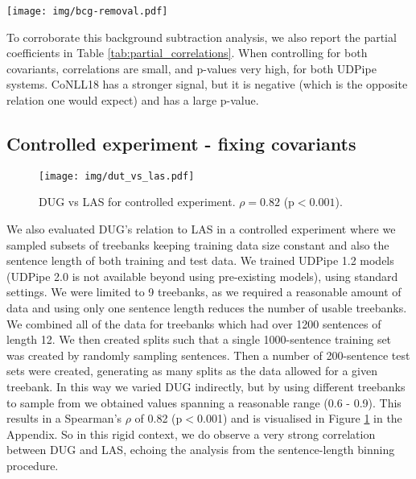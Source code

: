 \documentclass[11pt,a4paper]{article}
\newcommand{\MTL}{{$\langle L_{\textrm{test}}\rangle$}}
\begin{document}
\begin{figure*}[!btp]
    \centering
    \texttt{[image: img/bcg-removal.pdf]}
    \caption{Visualisation of removing background signal associated with covariants of the log of training size (log(Size)) and mean test length \MTL. The spearman's $\rho$ for DUG and LAS is -0.18 (p$=$0.083), for DUG and LAS/bcg$_{\textrm{size}}$ is -0.40 (p$<$0.001) compared to \MTL and LAS/bcg$_{\textrm{size}}$ of 0.465 (p$<$0.001), and finally DUG and LAS/bcg$_{\textrm{size}}$bcg$_{\textrm{Ltest}}$ is 0.01 (p$=$0.926).}
    \label{fig:noise-signal}
\end{figure*}
To corroborate this background subtraction analysis, we also report the partial coefficients in Table \ref{tab:partial_correlations}. When controlling for both covariants, correlations are small, and p-values very high, for both UDPipe systems. %
CoNLL18 
has a stronger signal, but it is negative (which is the opposite relation one would expect) and has a large p-value.



\subsection{Controlled experiment - fixing covariants}
\begin{figure}[b!]
    \centering
    \texttt{[image: img/dut\_vs\_las.pdf]}
    \caption{DUG vs LAS for controlled experiment. $\rho=0.82$ (p$<0.001$).}
    \label{fig:controlled}
\end{figure}

We also evaluated DUG's relation to LAS in a controlled experiment where we sampled subsets of treebanks keeping training data size constant and also the sentence length of both training and test data. We trained UDPipe 1.2 models (UDPipe 2.0 is not available beyond using pre-existing models), using standard settings. We were limited to 9 treebanks, 
as we required a reasonable amount of data and using only one sentence length reduces the number of usable treebanks. We combined all of the data for treebanks which had over 1200 sentences of length 12. We then created splits such that a single 1000-sentence training set
was created by randomly sampling sentences. Then a number of 200-sentence test sets were created, generating as many splits as the data allowed for a given treebank. In this way we varied DUG indirectly, but by using different treebanks to sample from we obtained values spanning a reasonable range (0.6 - 0.9). This results in a Spearman's $\rho$ of 0.82 (p$<$0.001) and is visualised in Figure \ref{fig:controlled} in the Appendix. So in this rigid context, we do observe a very strong correlation between DUG and LAS, echoing the analysis from the sentence-length binning procedure.
\end{document}
